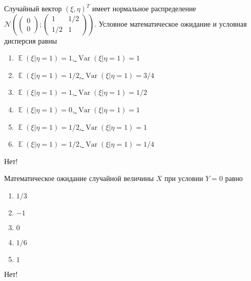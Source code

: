 \documentclass[t]{beamer}
\DeclareMathOperator{\Var}{Var}
\DeclareMathOperator{\E}{\mathbb{E}}
\newcommand{\cN}{\mathcal{N}}
\begin{document}
 \begin{frame} \label{28-No} 
\begin{block}{28} 

    Случайный вектор $(\xi, \eta)^T$ имеет нормальное распределение
    $\cN \left(
    \begin{pmatrix}
      0 \\
      0
    \end{pmatrix};
    \begin{pmatrix}
      1 & 1/2 \\
      1/2 & 1
    \end{pmatrix}
  \right)$. Условное математическое ожидание и условная дисперсия равны
  


 \end{block} 
\begin{enumerate} 
\item[] \hyperlink{28-No}{\beamergotobutton{} $\E(\xi | \eta=1)=1$, $\Var(\xi | \eta=1)=1$}
\item[] \hyperlink{28-Yes}{\beamergotobutton{} $\E(\xi | \eta=1)=1/2$, $\Var(\xi | \eta=1)=3/4$}
\item[] \hyperlink{28-No}{\beamergotobutton{} $\E(\xi | \eta=1)=1$, $\Var(\xi | \eta=1)=1/2$}
\item[] \hyperlink{28-No}{\beamergotobutton{} $\E(\xi | \eta=1)=0$, $\Var(\xi | \eta=1)=1$}
\item[] \hyperlink{28-No}{\beamergotobutton{} $\E(\xi | \eta=1)=1/2$, $\Var(\xi | \eta=1)=1$}
\item[] \hyperlink{28-No}{\beamergotobutton{} $\E(\xi | \eta=1)=1/2$, $\Var(\xi | \eta=1)=1/4$}
\end{enumerate} 

 \alert{Нет!} 
\end{frame} 


 \begin{frame} \label{29-No} 
\begin{block}{29} 

  Математическое ожидание случайной величины $X$ при условии $Y=0$ равно
  


 \end{block} 
\begin{enumerate} 
\item[] \hyperlink{29-No}{\beamergotobutton{} $1/3$}
\item[] \hyperlink{29-No}{\beamergotobutton{} $-1$}
\item[] \hyperlink{29-No}{\beamergotobutton{} $0$}
\item[] \hyperlink{29-No}{\beamergotobutton{} $1/6$}
\item[] \hyperlink{29-Yes}{\beamergotobutton{} $1$}
\end{enumerate} 

 \alert{Нет!} 
\end{frame} 
\end{document}
